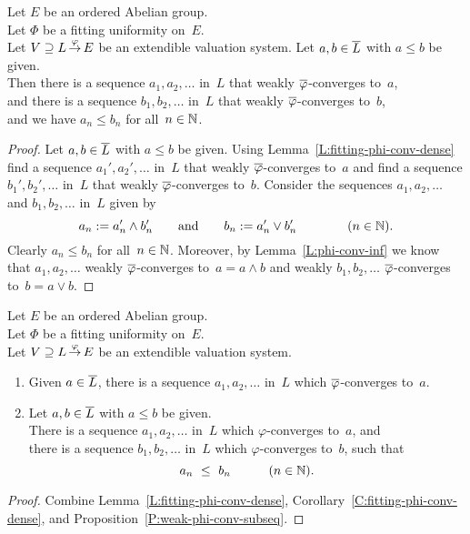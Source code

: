 \documentclass[main.tex]{subfiles}
\begin{document}
%
%
\begin{cor}
\label{C:fitting-phi-conv-dense}
Let $E$ be an ordered Abelian group.\\
Let $\Phi$ be a fitting uniformity on~$E$.\\
Let $V \supseteq L\,\smash{\stackrel{\varphi}{\rightarrow}}\,E$ be an extendible valuation system.
Let $a,b\in \overline L$ with $a\leq b$ be given.\\
Then there is a sequence
$a_1,a_2,\dotsc$ in~$L$ that weakly $\overline\varphi$-converges to~$a$,\\
and there is a sequence
$b_1,b_2,\dotsc$ in~$L$ that weakly $\overline\varphi$-converges to~$b$,\\
and we have $a_n \leq b_n$ for all~$n\in\mathbb{N}$.
\end{cor}
\begin{proof}
Let $a,b\in\overline L$ with $a\leq b$ be given.
Using Lemma~\ref{L:fitting-phi-conv-dense}
find a sequence $a_1',a_2',\dotsc$ in~$L$
that weakly $\overline\varphi$-converges to~$a$
and find a sequence $b_1',b_2',\dotsc$ in~$L$
that weakly $\overline\varphi$-converges to~$b$.
Consider the sequences
$a_1,a_2,\dotsc$ and $b_1,b_2,\dotsc$  in~$L$ 
given by  
\begin{equation*}
a_n := a_n'\wedge b_n'
\qquad\text{and}\qquad
b_n := a_n' \vee b_n'
\qquad\qquad(n\in\mathbb{N}).
\end{equation*}
Clearly $a_n \leq b_n$ for all~$n\in \mathbb{N}$.
Moreover,
by Lemma~\ref{L:phi-conv-inf} 
we know that $a_1,a_2,\dotsc$ 
weakly $\overline\varphi$-converges to~$a = a\wedge b$
and weakly $b_1,b_2,\dotsc$ $\overline\varphi$-converges to~$b= a\vee b$.
\end{proof}
%
%
\begin{prop}
\label{P:fitting-phi-conv-dense}
Let $E$ be an ordered Abelian group.\\
Let $\Phi$ be a fitting uniformity on~$E$.\\
Let $V \supseteq L\,\smash{\stackrel{\varphi}{\rightarrow}}\,E$ be an extendible valuation system.
\begin{enumerate}
\item
Given $a\in \overline L$,
 there is a sequence
$a_1,a_2,\dotsc$ in~$L$
which $\overline\varphi$-converges to~$a$.

\item
Let $a,b\in \overline L$ with $a\leq b$ be given.\\
There is a sequence 
$a_1,a_2,\dotsc$ in~$L$
which $\varphi$-converges to~$a$, and \\
there is a sequence
$b_1,b_2,\dotsc$ in~$L$
which $\varphi$-converges to~$b$, such that
\begin{equation*}
a_n \ \leq\ b_n \qquad\quad(n\in\mathbb{N}).
\end{equation*}
\end{enumerate}
\end{prop}
\begin{proof}
Combine Lemma~\ref{L:fitting-phi-conv-dense},
Corollary~\ref{C:fitting-phi-conv-dense},
and Proposition~\ref{P:weak-phi-conv-subseq}.
\end{proof}
\end{document}
